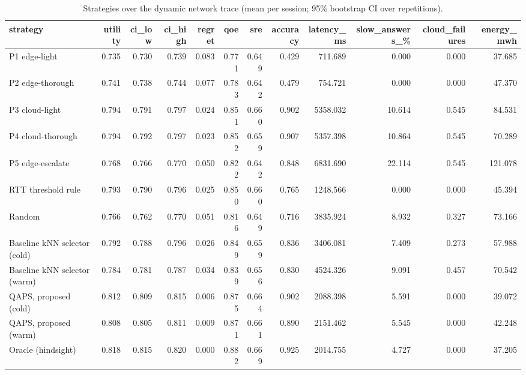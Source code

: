 \begin{table}[htbp]
\centering
\small
\caption{Strategies over the dynamic network trace (mean per session; 95\% bootstrap CI over repetitions).}
\label{tab:dynamic_summary}
\begin{tabular}{l r r r r r r r r r r r}
\toprule
strategy & utility & ci\_low & ci\_high & regret & qoe & sre & accuracy & latency\_ms & slow\_answers\_\% & cloud\_failures & energy\_mwh \\
\midrule
P1 edge-light & 0.735 & 0.730 & 0.739 & 0.083 & 0.771 & 0.649 & 0.429 & 711.689 & 0.000 & 0.000 & 37.685 \\
P2 edge-thorough & 0.741 & 0.738 & 0.744 & 0.077 & 0.783 & 0.642 & 0.479 & 754.721 & 0.000 & 0.000 & 47.370 \\
P3 cloud-light & 0.794 & 0.791 & 0.797 & 0.024 & 0.851 & 0.660 & 0.902 & 5358.032 & 10.614 & 0.545 & 84.531 \\
P4 cloud-thorough & 0.794 & 0.792 & 0.797 & 0.023 & 0.852 & 0.659 & 0.907 & 5357.398 & 10.864 & 0.545 & 70.289 \\
P5 edge-escalate & 0.768 & 0.766 & 0.770 & 0.050 & 0.822 & 0.642 & 0.848 & 6831.690 & 22.114 & 0.545 & 121.078 \\
RTT threshold rule & 0.793 & 0.790 & 0.796 & 0.025 & 0.850 & 0.660 & 0.765 & 1248.566 & 0.000 & 0.000 & 45.394 \\
Random & 0.766 & 0.762 & 0.770 & 0.051 & 0.816 & 0.649 & 0.716 & 3835.924 & 8.932 & 0.327 & 73.166 \\
Baseline kNN selector (cold) & 0.792 & 0.788 & 0.796 & 0.026 & 0.849 & 0.659 & 0.836 & 3406.081 & 7.409 & 0.273 & 57.988 \\
Baseline kNN selector (warm) & 0.784 & 0.781 & 0.787 & 0.034 & 0.839 & 0.656 & 0.830 & 4524.326 & 9.091 & 0.457 & 70.542 \\
QAPS, proposed (cold) & 0.812 & 0.809 & 0.815 & 0.006 & 0.875 & 0.664 & 0.902 & 2088.398 & 5.591 & 0.000 & 39.072 \\
QAPS, proposed (warm) & 0.808 & 0.805 & 0.811 & 0.009 & 0.871 & 0.661 & 0.890 & 2151.462 & 5.545 & 0.000 & 42.248 \\
Oracle (hindsight) & 0.818 & 0.815 & 0.820 & 0.000 & 0.882 & 0.669 & 0.925 & 2014.755 & 4.727 & 0.000 & 37.205 \\
\bottomrule
\end{tabular}
\end{table}
